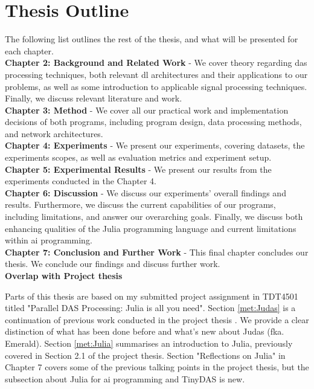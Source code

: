 \section{Thesis Outline}

The following list outlines the rest of the thesis, and what will be presented for each chapter. \\


\textbf{Chapter 2: Background and Related Work} - We cover theory regarding \acrshort{das} processing techniques, both relevant \acrshort{dl} architectures and their applications to our problems, as well as some introduction to applicable signal processing techniques. Finally, we discuss relevant literature and work.  \\

\textbf{Chapter 3: Method} - We cover all our practical work and implementation decisions of both programs, including program design, data processing methods, and network architectures. \\

\textbf{Chapter 4: Experiments} - We present our experiments, covering datasets, the experiments scopes, as well as evaluation metrics and experiment setup. \\

\textbf{Chapter 5: Experimental Results} - We present our results from the experiments conducted in the Chapter 4. \\

\textbf{Chapter 6: Discussion} - We discuss our experiments' overall findings and results. Furthermore, we discuss the current capabilities of our programs, including limitations, and answer our overarching goals. Finally, we discuss both enhancing qualities of the Julia programming language and current limitations within \acrshort{ai} programming. \\

\textbf{Chapter 7: Conclusion and Further Work} - This final chapter concludes our thesis. We conclude our findings and discuss further work. \\

\textbf{Overlap with Project thesis}

Parts of this thesis are based on my submitted project assignment in TDT4501 titled "Parallel DAS Processing: Julia is all you need". Section \ref{met:Judas} is a continuation of previous work conducted in the project thesis \cite{projthesis}. We provide a clear distinction of what has been done before and what's new about Judas (fka. Emerald). Section \ref{met:Julia} summarises an introduction to Julia, previously covered in Section 2.1 of the project thesis. Section "Reflections on Julia" in Chapter 7 covers some of the previous talking points in the project thesis, but the subsection about Julia for \acrshort{ai} programming and TinyDAS is new.